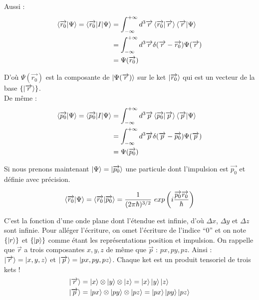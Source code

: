 \documentclass[12pt,a4paper,titlepage]{book}
\begin{document}
Aussi :\\
\begin{align*}
\braket{\overrightarrow{r_0} \vert \Psi} = \braket{\overrightarrow{r_0} \vert I \vert \Psi} &= \int_{- \infty}^{+ \infty} d^3 \overrightarrow{r} \braket{\overrightarrow{r_0} \vert \overrightarrow{r}} \braket{\overrightarrow{r} \vert \Psi}\\
&= \int_{- \infty}^{+ \infty} d^3 \overrightarrow{r} \delta (\overrightarrow{r} - \overrightarrow{r_0}) \Psi (\overrightarrow{r})\\
&= \Psi (\overrightarrow{r_0})
\end{align*}

D'où $\Psi (\overrightarrow{r_0})$ est la composante de $\ket{\Psi (\overrightarrow{r})}$ sur le ket $\ket{\overrightarrow{r_0}}$ qui est un vecteur de la base $\lbrace \ket{\overrightarrow{r}} \rbrace$.\\

De même :
\begin{align*}
\braket{\overrightarrow{p_0} \vert \Psi} = \braket{\overrightarrow{p_0} \vert I \vert \Psi} &= \int_{- \infty}^{+ \infty} d^3 \overrightarrow{p} \braket{\overrightarrow{p_0} \vert \overrightarrow{p}} \braket{\overrightarrow{p} \vert \Psi}\\
&= \int_{- \infty}^{+ \infty} d^3 \overrightarrow{p} \delta (\overrightarrow{p} - \overrightarrow{p_0}) \Psi (\overrightarrow{p})\\
&= \Psi (\overrightarrow{p_0})
\end{align*}

Si nous prenons maintenant $\ket\Psi = \ket{\overrightarrow{p_0}}$ une particule dont l'impulsion est $\overrightarrow{p_0}$ et définie avec précision.

\begin{equation*}
\braket{\overrightarrow{r_0} \vert \Psi} = \braket{\overrightarrow{r_0} \vert \overrightarrow{p_0}} = \frac{1}{(2 \pi \hbar)^{3/2}} ~exp \left( i \frac{\overrightarrow{p_0} \overrightarrow{r_0}}{\hbar} \right)
\end{equation*}

C'est la fonction d'une onde plane dont l'étendue est infinie, d'où $\Delta x$, $\Delta y$ et $\Delta z$ sont infinie. Pour alléger l'écriture, on omet l'écriture de l'indice \enquote{0} et on note $\lbrace \ket{r} \rbrace$ et $\lbrace \ket{p} \rbrace$ comme étant les représentations position et impulsion. On rappelle que $\overrightarrow{r}$ a trois composantes $x,y,z$ de même que $\overrightarrow{p}$ : $px,py,pz$. Ainsi : $\ket{\overrightarrow{r}} = \ket{x,y,z}$ et $\ket{\overrightarrow{p}} = \ket{px,py,pz}$. Chaque ket est un produit tensoriel de trois kets !
\begin{align*}
\ket{\overrightarrow{r}} &= \ket{x} \otimes \ket{y} \otimes \ket{z} = \ket{x} \ket{y} \ket{z}\\
\ket{\overrightarrow{p}} &= \ket{px} \otimes \ket{py} \otimes \ket{pz} = \ket{px} \ket{py} \ket{pz}
\end{align*}
\end{document}
